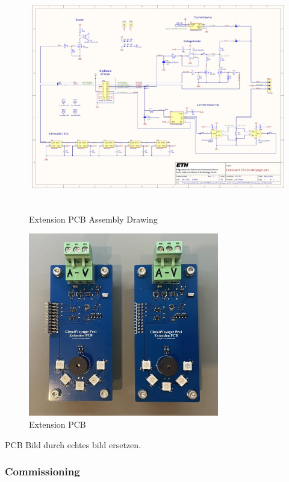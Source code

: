 \begin{figure}[H]
	\centering
	\includegraphics[height=10cm, page=2]{../../../5_Hardware/PCB_EXTENSION_CircuitVoyager_pre1/Project Outputs for PCB_EXT_CV_PRE1/PCB_EXTENSION_CircuitVoyager_pre1.pdf}
	\caption{Extension PCB Assembly Drawing}
	\label{fig:Extension PCB Assembly Drawing}
\end{figure}



\begin{figure}[H]
	\centering
	\includegraphics[height=8cm]{Resources/PCB.png}
	\caption{Extension PCB}
	\label{fig:Extension PCB}
\end{figure}
PCB Bild durch echtes bild ersetzen.

\newpage
\subsubsection{Commissioning}


